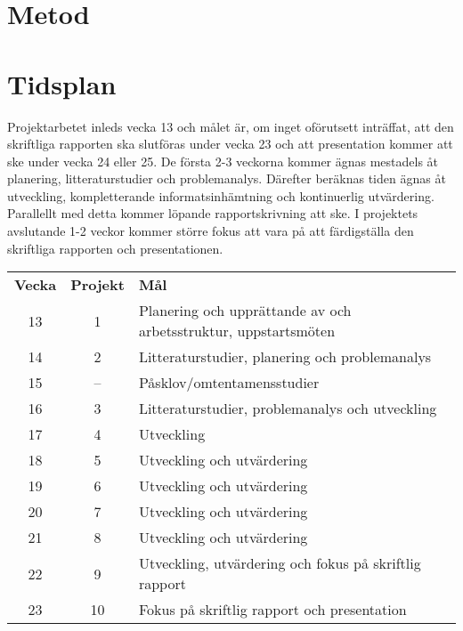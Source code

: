 \documentclass{article}
\begin{document}

\section{Metod}
\label{sec:metod} %


\section{Tidsplan}
\label{sec:tidsplan} %
    Projektarbetet inleds vecka 13 och målet är, om inget oförutsett inträffat, att den skriftliga rapporten ska slutföras under vecka 23 och att presentation kommer att ske under vecka 24 eller 25. De första 2-3 veckorna kommer ägnas mestadels åt planering, litteraturstudier och problemanalys. Därefter beräknas tiden ägnas åt utveckling, kompletterande informatsinhämtning och kontinuerlig utvärdering. Parallellt med detta kommer löpande rapportskrivning att ske. I projektets avslutande 1-2 veckor kommer större fokus att vara på att färdigställa den skriftliga rapporten och presentationen. \bigskip

    \noindent \begin{tabularx}{\textwidth}{@{}ccX}
        \textbf{Vecka} & \textbf{Projekt} & \textbf{Mål}\\
        13 & 1 & Planering och upprättande av och arbetsstruktur, uppstartsmöten \\
        14 & 2  & Litteraturstudier, planering och problemanalys \\
        15 & -- & Påsklov/omtentamensstudier \\
        16 & 3  & Litteraturstudier, problemanalys och utveckling \\
        17 & 4  & Utveckling \\
        18 & 5  & Utveckling och utvärdering \\
        19 & 6  & Utveckling och utvärdering \\
        20 & 7  & Utveckling och utvärdering \\
        21 & 8  & Utveckling och utvärdering \\
        22 & 9  & Utveckling, utvärdering och fokus på skriftlig rapport \\
        23 & 10 & Fokus på skriftlig rapport och presentation \\
    \end{tabularx}

\end{document}
